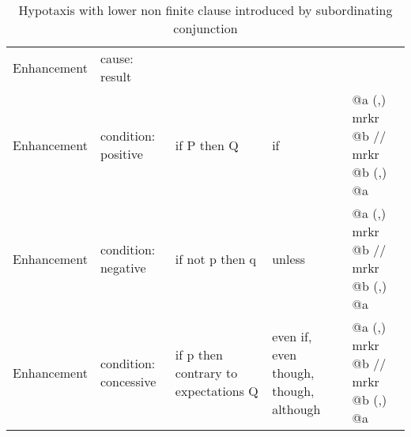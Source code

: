 \begin{landscape}
\begin{table}[]
{\begin{tabulary}{2\textwidth}{p{7em}p{10em}p{10em}p{18em}p{18em}}
        Enhancement & cause: result &  &  &  \\
        Enhancement & condition: positive & if P then Q & if & @a (,) mrkr @b // mrkr @b (,) @a \\
        Enhancement & condition: negative & if not p then q & unless & @a (,) mrkr @b // mrkr @b (,) @a \\
        Enhancement & condition: concessive & if p then contrary to expectations Q & even if, even though, though, although & @a (,) mrkr @b // mrkr @b (,) @a \\ \bottomrule
        \end{tabulary}%
    }
    \caption{Hypotaxis with lower non finite clause introduced by subordinating conjunction}
    \label{tab:hypotaxis-non-finite-conjunction}
    \end{table}
    \end{landscape}
    
    \newpage
    

